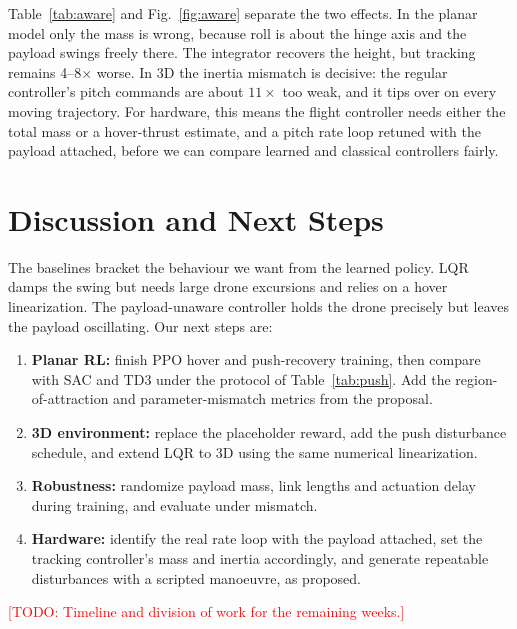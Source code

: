 \documentclass{article}
\newcommand{\todo}[1]{\textcolor{red}{[TODO: #1]}}
\begin{document}
Table~\ref{tab:aware} and Fig.~\ref{fig:aware} separate the two effects. In the
planar model only the mass is wrong, because roll is about the hinge axis and the
payload swings freely there. The integrator recovers the height, but tracking remains
4--8$\times$ worse. In 3D the inertia mismatch is decisive: the regular controller's
pitch commands are about $11\times$ too weak, and it tips over on every moving
trajectory. For hardware, this means the flight controller needs either the total
mass or a hover-thrust estimate, and a pitch rate loop retuned with the payload
attached, before we can compare learned and classical controllers fairly.

\section{Discussion and Next Steps}
\label{sec:next}
The baselines bracket the behaviour we want from the learned policy. LQR damps the
swing but needs large drone excursions and relies on a hover linearization. The
payload-unaware controller holds the drone precisely but leaves the payload
oscillating. Our next steps are:
\begin{enumerate}
  \item \textbf{Planar RL:} finish PPO hover and push-recovery training, then compare
        with SAC and TD3 under the protocol of Table~\ref{tab:push}. Add the
        region-of-attraction and parameter-mismatch metrics from the proposal.
  \item \textbf{3D environment:} replace the placeholder reward, add the push
        disturbance schedule, and extend LQR to 3D using the same numerical
        linearization.
  \item \textbf{Robustness:} randomize payload mass, link lengths and actuation delay
        during training, and evaluate under mismatch.
  \item \textbf{Hardware:} identify the real rate loop with the payload attached,
        set the tracking controller's mass and inertia accordingly, and generate
        repeatable disturbances with a scripted manoeuvre, as proposed.
\end{enumerate}
\todo{Timeline and division of work for the remaining weeks.}


\end{document}
